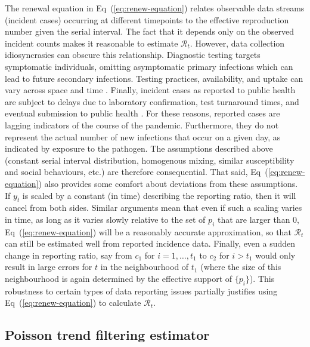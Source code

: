 \documentclass[10pt,letterpaper]{article}
\def\calR{\mathcal{R}}
\newcommand{\citep}[1]{\cite{#1}}
\renewcommand{\eqref}[1]{Eq~(\ref{#1})}
\begin{document}
The renewal equation in \eqref{eq:renew-equation} relates observable data
streams (incident cases) occurring at different timepoints to the effective reproduction
number given the serial interval. The fact that it depends only on the observed
incident counts makes it reasonable to estimate $\calR_t$. However, 
data collection idiosyncrasies can obscure this relationship. Diagnostic testing
targets symptomatic individuals, omitting asymptomatic primary infections which
can lead to future secondary infections. Testing practices, availability, and
uptake can vary across space and time \citep{pitzer2021impact,
hitchings2021usefulness}. Finally, incident cases as reported to public health
are subject to delays due to laboratory confirmation, test turnaround times, and
eventual submission to public health \citep{pellis2021challenges}. For these
reasons, reported cases are lagging indicators of the course of the pandemic.
Furthermore, they do not represent the actual number of new infections that
occur on a given day, as indicated by exposure to the pathogen. The assumptions
described above (constant serial interval distribution, homogenous mixing,
similar susceptibility and social behaviours, etc.) are therefore consequential.
That said, \eqref{eq:renew-equation} also provides some comfort about deviations
from these assumptions. If $y_t$ is scaled by a constant (in time) describing
the reporting ratio, then it will cancel from both sides. Similar arguments mean
that even if such a scaling varies in time, as long as it varies slowly relative
to the set of $p_i$ that are larger than 0, \eqref{eq:renew-equation} will be a
reasonably accurate approximation, so that $\calR_t$ can still be estimated well
from reported incidence data. Finally, even a sudden change in reporting ratio, 
say from $c_1$ for $i=1,\ldots,t_1$ to $c_2$ for $i>t_1$ would only result in 
large errors for $t$ in the neighbourhood of $t_1$ (where the size of this 
neighbourhood is again determined by the effective support of $\{p_i\}$). 
This robustness to certain types of data reporting issues partially justifies 
using \eqref{eq:renew-equation} to calculate $\calR_t$.


\subsection{Poisson trend filtering estimator} 
\end{document}
